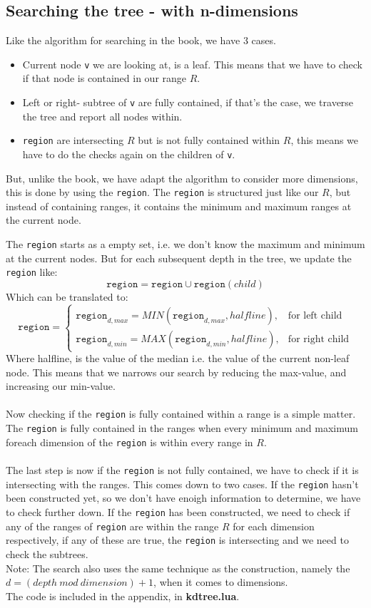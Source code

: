 \documentclass{article}
\begin{document}
\subsection{Searching the tree - with n-dimensions}
Like the algorithm for searching in the book, we have 3 cases.
\begin{itemize}
 \item Current node \texttt{v} we are looking at, is a leaf. This means that we have to check if that node is contained in our range $R$.
 \item Left or right- subtree of \texttt{v} are fully contained, if that's the case, we traverse the tree and report all nodes within.
 \item \texttt{region} are intersecting $R$ but is not fully contained within $R$, this means we have to do the checks again on the children of \texttt{v}.
\end{itemize}
But, unlike the book, we have adapt the algorithm to consider more dimensions, this is done by using the \texttt{region}.
The \texttt{region} is structured just like our $R$, but instead of containing ranges, it contains the minimum and maximum ranges at the current node.

The \texttt{region} starts as a empty set, i.e. we don't know the maximum and minimum at the current nodes. 
But for each subsequent depth in the tree, we update the \texttt{region} like:
\[
    \texttt{region}= 
    \texttt{region} \cup \texttt{region}(child)
\]
Which can be translated to:
\[
    \texttt{region}= 
\begin{cases}
    \texttt{region}_{d,max} = MIN(\texttt{region}_{d,max},halfline),&\text{for left child} \\
    \texttt{region}_{d,min} = MAX(\texttt{region}_{d,min},halfline),& \text{for right child}
\end{cases}
\]
Where halfline, is the value of the median i.e. the value of the current non-leaf node.
This means that we narrows our search by reducing the max-value, and increasing our min-value.\\
 \\
Now checking if the \texttt{region} is fully contained within a range is a simple matter.
The \texttt{region} is fully contained in the ranges when every minimum and maximum foreach dimension of the \texttt{region} is within every range in $R$.\\
 \\
The last step is now if the \texttt{region} is not fully contained, we have to check if it is intersecting with the ranges. This comes down to two cases.
If the \texttt{region} hasn't been constructed yet, so we don't have enoigh information to determine, we have to check further down.
If the \texttt{region} has been constructed, we need to check if any of the ranges of \texttt{region} are within the range $R$ for each dimension respectively, if any of these are true,
the \texttt{region} is intersecting and we need to check the subtrees.\\
Note: The search also uses the same technique as the construction, namely the $d = (depth\ mod\ dimension)+1$, when it comes to dimensions.
 \\
The code is included in the appendix, in \textbf{kdtree.lua}.
\end{document}
